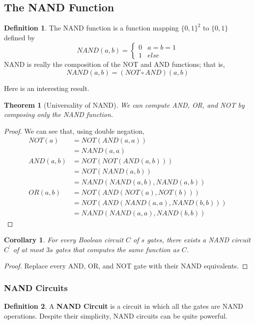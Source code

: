 \documentclass[a4paper, 12pt]{report}
\newtheorem{theorem}{Theorem}[section]
\newtheorem{corollary}{Corollary}[theorem]
\theoremstyle{remark}
\theoremstyle{definition}
\newtheorem{definition}{Definition}[section]
\begin{document}
\subsection{The NAND Function}
\begin{definition}
The NAND function is a function mapping $\{0,1\}^2$ to $\{0,1\}$ defined by
\[NAND(a, b) = \begin{cases}
0 & a = b = 1 \\
1 & else
\end{cases}\]
NAND is really the composition of the NOT and AND functions; that is, 
\[NAND(a, b) = (NOT \circ AND) (a, b)\]
\end{definition}

Here is an interesting result. 

\begin{theorem}[Universality of NAND]
We can compute AND, OR, and NOT by composing only the NAND function. 
\end{theorem}
\begin{proof}
We can see that, using double negation, 
\begin{align*}
    NOT(a) & = NOT(AND(a, a)) \\
    & = NAND(a, a)\\
    AND(a, b) & = NOT(NOT(AND(a, b))) \\
    & = NOT(NAND(a, b)) \\
    & = NAND(NAND(a, b), NAND(a, b)) \\
    OR(a, b) & = NOT(AND(NOT(a), NOT(b))) \\
    & = NOT(AND(NAND(a,a), NAND(b,b))) \\
    & = NAND(NAND(a, a), NAND(b, b)) 
\end{align*}
\end{proof}

\begin{corollary}
For every Boolean circuit $C$ of $s$ gates, there exists a NAND circuit $C^\prime$ of at most $3s$ gates that computes the same function as $C$. 
\end{corollary}
\begin{proof}
Replace every AND, OR, and NOT gate with their NAND equivalents. 
\end{proof}

\subsubsection{NAND Circuits}

\begin{definition}
A \textbf{NAND Circuit} is a circuit in which all the gates are NAND operations. Despite their simplicity, NAND circuits can be quite powerful. 
\end{definition}
\end{document}
